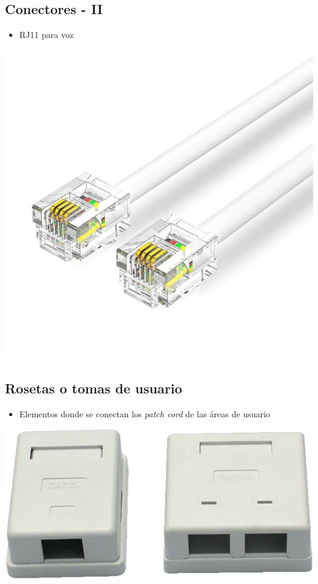 \documentclass[11pt]{article}
\begin{document}
\subsection{Conectores - II}
\label{sec:orgc7ee4e3}
\begin{itemize}
\item RJ11 para voz
\end{itemize}
\begin{center}
\includegraphics[width=.9\linewidth]{./media/cable-de-telefono-rj11-6p4c-m-m-3-m-blanco.png}
\end{center}
\subsection{Rosetas o tomas de usuario}
\label{sec:org81956bf}
\begin{itemize}
\item Elementos donde se conectan los \emph{patch cord} de las áreas de usuario
\end{itemize}
\begin{center}
\includegraphics[width=.9\linewidth]{./media/ethernet_es-roseta-vacia.png}
\end{center}
\end{document}
